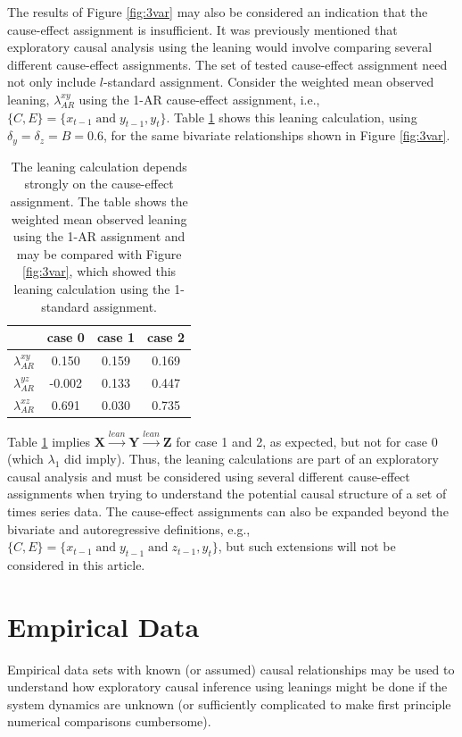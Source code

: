 \documentclass[a4paper,11pt,twocolumn]{article}
\begin{document}
The results of Figure \ref{fig:3var} may also be considered an indication that the cause-effect assignment is insufficient.  It was previously mentioned that exploratory causal analysis using the leaning would involve comparing several different cause-effect assignments.  The set of tested cause-effect assignment need not only include $l$-standard assignment.  Consider the weighted mean observed leaning, $\lambda_{AR}^{xy}$ using the 1-AR cause-effect assignment, i.e., $\{C,E\} = \{x_{t-1}\;\mathrm{ and }\;y_{t-1},y_t\}$.  Table \ref{tab:3var} shows this leaning calculation, using $\delta_y=\delta_z=B=0.6$, for the same bivariate relationships shown in Figure \ref{fig:3var}.
\begin{table}
\begin{tabular}{lccc}
 & case 0 & case 1 & case 2\\
 \hline
 $\lambda_{AR}^{xy}$ & 0.150 & 0.159 & 0.169\\
 $\lambda_{AR}^{yz}$ & -0.002 & 0.133 & 0.447\\
 $\lambda_{AR}^{xz}$ & 0.691 & 0.030 & 0.735\\
\end{tabular}
\caption{The leaning calculation depends strongly on the cause-effect assignment.  The table shows the weighted mean observed leaning using the 1-AR assignment and may be compared with Figure \ref{fig:3var}, which showed this leaning calculation using the 1-standard assignment.}
\label{tab:3var}
\end{table}

Table \ref{tab:3var} implies $\mathbf{X}\xrightarrow{lean}\mathbf{Y}\xrightarrow{lean}\mathbf{Z}$ for case 1 and 2, as expected, but not for case 0 (which $\lambda_1$ did imply).  Thus, the leaning calculations are part of an exploratory causal analysis and must be considered using several different cause-effect assignments when trying to understand the potential causal structure of a set of times series data.  The cause-effect assignments can also be expanded beyond the bivariate and autoregressive definitions, e.g., $\{C,E\} = \{x_{t-1}\;\mathrm{ and }\;y_{t-1}\;\mathrm{ and }\;z_{t-1},y_t\}$, but such extensions will not be considered in this article.

\section{Empirical Data}
Empirical data sets with known (or assumed) causal relationships may be used to understand how exploratory causal inference using leanings might be done if the system dynamics are unknown (or sufficiently complicated to make first principle numerical comparisons cumbersome).
\end{document}
